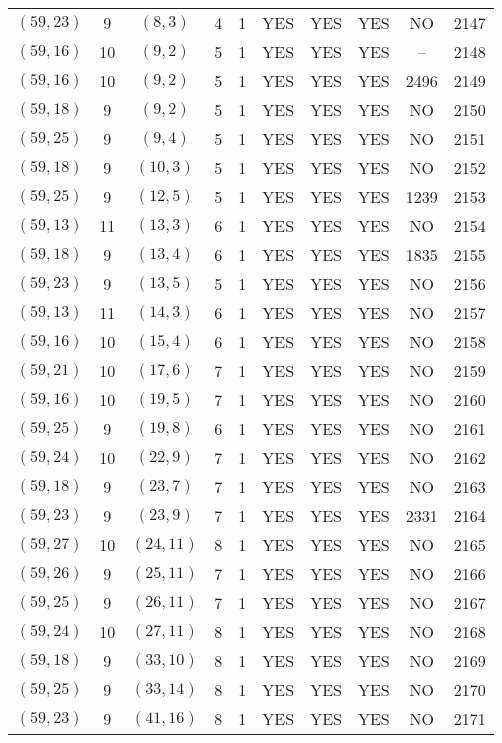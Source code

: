 \begin{longtable}{|c|c|c|c|c|c|c|c|c|c|}
$(59, 23)$ & 9 & $(8, 3)$ & 4 & 1 & YES & YES & YES & NO & 2147\\
$(59, 16)$ & 10 & $(9, 2)$ & 5 & 1 & YES & YES & YES & -- & 2148\\
$(59, 16)$ & 10 & $(9, 2)$ & 5 & 1 & YES & YES & YES & 2496 & 2149\\
$(59, 18)$ & 9 & $(9, 2)$ & 5 & 1 & YES & YES & YES & NO & 2150\\
$(59, 25)$ & 9 & $(9, 4)$ & 5 & 1 & YES & YES & YES & NO & 2151\\
$(59, 18)$ & 9 & $(10, 3)$ & 5 & 1 & YES & YES & YES & NO & 2152\\
$(59, 25)$ & 9 & $(12, 5)$ & 5 & 1 & YES & YES & YES & 1239 & 2153\\
$(59, 13)$ & 11 & $(13, 3)$ & 6 & 1 & YES & YES & YES & NO & 2154\\
$(59, 18)$ & 9 & $(13, 4)$ & 6 & 1 & YES & YES & YES & 1835 & 2155\\
$(59, 23)$ & 9 & $(13, 5)$ & 5 & 1 & YES & YES & YES & NO & 2156\\
$(59, 13)$ & 11 & $(14, 3)$ & 6 & 1 & YES & YES & YES & NO & 2157\\
$(59, 16)$ & 10 & $(15, 4)$ & 6 & 1 & YES & YES & YES & NO & 2158\\
$(59, 21)$ & 10 & $(17, 6)$ & 7 & 1 & YES & YES & YES & NO & 2159\\
$(59, 16)$ & 10 & $(19, 5)$ & 7 & 1 & YES & YES & YES & NO & 2160\\
$(59, 25)$ & 9 & $(19, 8)$ & 6 & 1 & YES & YES & YES & NO & 2161\\
$(59, 24)$ & 10 & $(22, 9)$ & 7 & 1 & YES & YES & YES & NO & 2162\\
$(59, 18)$ & 9 & $(23, 7)$ & 7 & 1 & YES & YES & YES & NO & 2163\\
$(59, 23)$ & 9 & $(23, 9)$ & 7 & 1 & YES & YES & YES & 2331 & 2164\\
$(59, 27)$ & 10 & $(24, 11)$ & 8 & 1 & YES & YES & YES & NO & 2165\\
$(59, 26)$ & 9 & $(25, 11)$ & 7 & 1 & YES & YES & YES & NO & 2166\\
$(59, 25)$ & 9 & $(26, 11)$ & 7 & 1 & YES & YES & YES & NO & 2167\\
$(59, 24)$ & 10 & $(27, 11)$ & 8 & 1 & YES & YES & YES & NO & 2168\\
$(59, 18)$ & 9 & $(33, 10)$ & 8 & 1 & YES & YES & YES & NO & 2169\\
$(59, 25)$ & 9 & $(33, 14)$ & 8 & 1 & YES & YES & YES & NO & 2170\\
$(59, 23)$ & 9 & $(41, 16)$ & 8 & 1 & YES & YES & YES & NO & 2171\\

\end{longtable}
